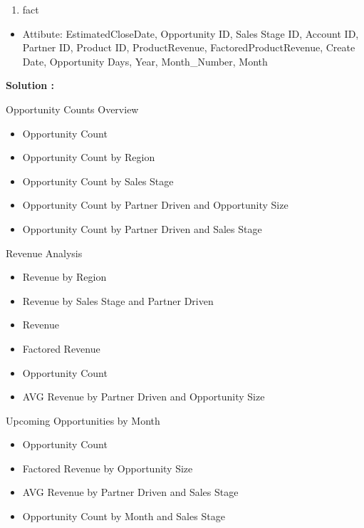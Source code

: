 \documentclass[]{book}
\providecommand{\tightlist}{%
  \setlength{\itemsep}{0pt}\setlength{\parskip}{0pt}}
\begin{document}
\begin{enumerate}
\def\labelenumi{\arabic{enumi}.}
\setcounter{enumi}{4}
\tightlist
\item
  fact
\end{enumerate}

\begin{itemize}
\tightlist
\item
  Attibute: EstimatedCloseDate, Opportunity ID, Sales Stage ID, Account
  ID, Partner ID, Product ID, ProductRevenue, FactoredProductRevenue,
  Create Date, Opportunity Days, Year, Month\_Number, Month
\end{itemize}

\textbf{Solution : }

Opportunity Counts Overview

\begin{itemize}
\tightlist
\item
  Opportunity Count
\item
  Opportunity Count by Region
\item
  Opportunity Count by Sales Stage
\item
  Opportunity Count by Partner Driven and Opportunity Size
\item
  Opportunity Count by Partner Driven and Sales Stage
\end{itemize}

Revenue Analysis

\begin{itemize}
\tightlist
\item
  Revenue by Region
\item
  Revenue by Sales Stage and Partner Driven
\item
  Revenue
\item
  Factored Revenue
\item
  Opportunity Count
\item
  AVG Revenue by Partner Driven and Opportunity Size
\end{itemize}

Upcoming Opportunities by Month

\begin{itemize}
\tightlist
\item
  Opportunity Count
\item
  Factored Revenue by Opportunity Size
\item
  AVG Revenue by Partner Driven and Sales Stage
\item
  Opportunity Count by Month and Sales Stage
\end{itemize}
\end{document}
